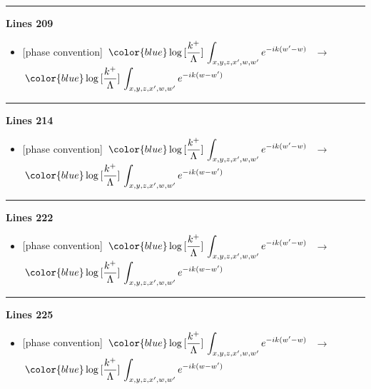\documentclass[10pt]{article}
\begin{document}
\noindent\rule{\linewidth}{0.3pt}\par\noindent\textbf{Lines 209} \par
\begin{itemize}[leftmargin=2.2em,itemsep=1pt,topsep=2pt]
\item[\textbf{l.209}] \textsf{\small [phase convention]} $\displaystyle \, {\color{blue}\log{[\frac{k^{+}}{\Lambda}]}}\, \int_{x,y,z,x^{\prime},w,w^{\prime}}e^{-ik(w^{\prime}-w)}\,$\ $\longrightarrow$\ $\displaystyle \, {\color{blue}\log{[\frac{k^{+}}{\Lambda}]}}\, \int_{x,y,z,x^{\prime},w,w^{\prime}}e^{-ik(w-w^{\prime})}\,$
\end{itemize}
\noindent\rule{\linewidth}{0.3pt}\par\noindent\textbf{Lines 214} \par
\begin{itemize}[leftmargin=2.2em,itemsep=1pt,topsep=2pt]
\item[\textbf{l.214}] \textsf{\small [phase convention]} $\displaystyle \, {\color{blue}\log{[\frac{k^{+}}{\Lambda}]}}\, \int_{x,y,z,x^{\prime},w,w^{\prime}}e^{-ik(w^{\prime}-w)}\,$\ $\longrightarrow$\ $\displaystyle \, {\color{blue}\log{[\frac{k^{+}}{\Lambda}]}}\, \int_{x,y,z,x^{\prime},w,w^{\prime}}e^{-ik(w-w^{\prime})}\,$
\end{itemize}
\noindent\rule{\linewidth}{0.3pt}\par\noindent\textbf{Lines 222} \par
\begin{itemize}[leftmargin=2.2em,itemsep=1pt,topsep=2pt]
\item[\textbf{l.222}] \textsf{\small [phase convention]} $\displaystyle \, {\color{blue}\log{[\frac{k^{+}}{\Lambda}]}}\,\int_{x,y,z,x^{\prime},w,w^{\prime}}e^{-ik(w^{\prime}-w)}\,$\ $\longrightarrow$\ $\displaystyle \, {\color{blue}\log{[\frac{k^{+}}{\Lambda}]}}\,\int_{x,y,z,x^{\prime},w,w^{\prime}}e^{-ik(w-w^{\prime})}\,$
\end{itemize}
\noindent\rule{\linewidth}{0.3pt}\par\noindent\textbf{Lines 225} \par
\begin{itemize}[leftmargin=2.2em,itemsep=1pt,topsep=2pt]
\item[\textbf{l.225}] \textsf{\small [phase convention]} $\displaystyle \, {\color{blue}\log{[\frac{k^{+}}{\Lambda}]}}\, \int_{x,y,z,x^{\prime},w,w^{\prime}}e^{-ik(w^{\prime}-w)}\,$\ $\longrightarrow$\ $\displaystyle \, {\color{blue}\log{[\frac{k^{+}}{\Lambda}]}}\, \int_{x,y,z,x^{\prime},w,w^{\prime}}e^{-ik(w-w^{\prime})}\,$
\end{itemize}
\end{document}
